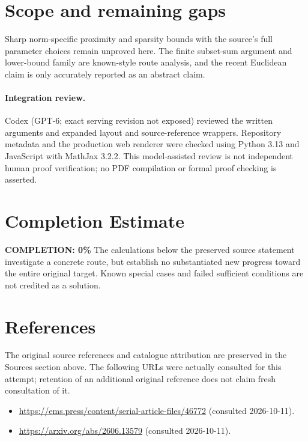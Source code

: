 \documentclass[11pt]{article}
\begin{document}
\section{Scope and remaining gaps}
Sharp norm-specific proximity and sparsity bounds with the source's full parameter choices remain unproved here. The finite subset-sum argument and lower-bound family are known-style route analysis, and the recent Euclidean claim is only accurately reported as an abstract claim.
\paragraph{Integration review.} Codex (GPT-6; exact serving revision not exposed) reviewed the written arguments and expanded layout and source-reference wrappers. Repository metadata and the production web renderer were checked using Python 3.13 and JavaScript with MathJax 3.2.2. This model-assisted review is not independent human proof verification; no PDF compilation or formal proof checking is asserted.

\section{Completion Estimate}
\noindent\textbf{COMPLETION: 0\%}
The calculations below the preserved source statement investigate a concrete route,
but establish no substantiated new progress toward the entire original target.
Known special cases and failed sufficient conditions are not credited as a solution.
\section{References}
The original source references and catalogue attribution are preserved in the
Sources section above. The following URLs were actually consulted for this attempt;
retention of an additional original reference does not claim fresh consultation of it.
\begin{itemize}
\item \url{https://ems.press/content/serial-article-files/46772} (consulted 2026-10-11). 
\item \url{https://arxiv.org/abs/2606.13579} (consulted 2026-10-11). 
\end{itemize}
\end{document}
